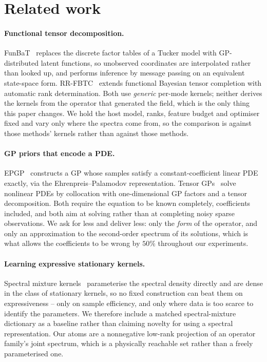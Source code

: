\section{Related work}
\label{sec:related}

\paragraph{Functional tensor decomposition.}
FunBaT~\citep{funbat2024} replaces the discrete factor tables of a Tucker model
with GP-distributed latent functions, so unobserved coordinates are interpolated
rather than looked up, and performs inference by message passing on an
equivalent state-space form.  RR-FBTC~\citep{rrfbtc2025} extends functional
Bayesian tensor completion with automatic rank determination.  Both use
\emph{generic} per-mode kernels; neither derives the kernels from the operator
that generated the field, which is the only thing this paper changes.  We hold
the host model, ranks, feature budget and optimiser fixed and vary only where
the spectra come from, so the comparison is against those methods' kernels
rather than against those methods.

\paragraph{GP priors that encode a PDE.}
EPGP~\citep{epgp2023} constructs a GP whose samples satisfy a constant-coefficient
linear PDE exactly, via the Ehrenpreis--Palamodov representation.  Tensor
GPs~\citep{tensorgp2025} solve nonlinear PDEs by collocation with
one-dimensional GP factors and a tensor decomposition.  Both require the equation
to be known completely, coefficients included, and both aim at solving rather
than at completing noisy sparse observations.  We ask for less and deliver less:
only the \emph{form} of the operator, and only an approximation to the
second-order spectrum of its solutions, which is what allows the coefficients to
be wrong by $50\%$ throughout our experiments.

\paragraph{Learning expressive stationary kernels.}
Spectral mixture kernels~\citep{spectralmixture2013} parameterise the spectral density
directly and are dense in the class of stationary kernels, so no fixed
construction can beat them on expressiveness -- only on sample efficiency, and
only where data is too scarce to identify the parameters.  We therefore include a
matched spectral-mixture dictionary as a baseline rather than claiming novelty
for using a spectral representation.  Our atoms are a nonnegative low-rank
projection of an operator family's joint spectrum, which is a physically
reachable set rather than a freely parameterised one.

